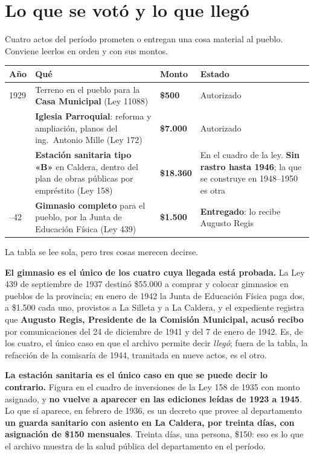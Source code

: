 \section{Lo que se votó y lo que llegó}

Cuatro actos del período prometen o entregan una cosa material al pueblo. Conviene leerlos en
orden y con sus montos.

{\small
\begin{longtable}{@{}p{1.4cm}p{5.5cm}p{2.2cm}p{3.5cm}@{}}
\toprule
\textbf{Año} & \textbf{Qué} & \textbf{Monto} & \textbf{Estado} \\
\midrule
\endhead
1929 & Terreno en el pueblo para la \textbf{Casa Municipal} (Ley 11088) & \textbf{\$500} & Autorizado \\
\addlinespace
1935 & \textbf{Iglesia Parroquial}: reforma y ampliación, planos del ing.\ Antonio Mille (Ley 172) & \textbf{\$7.000} & Autorizado \\
\addlinespace
1935 & \textbf{Estación sanitaria tipo «B»} en Caldera, dentro del plan de obras públicas por empréstito (Ley 158) & \textbf{\$18.360} & En el cuadro de la ley. \textbf{Sin rastro hasta 1946}; la que se construye en 1948--1950 es otra \\
\addlinespace
1937--42 & \textbf{Gimnasio completo} para el pueblo, por la Junta de Educación Física (Ley 439) & \textbf{\$1.500} & \textbf{Entregado}: lo recibe Augusto Regis\index{Regis, Augusto} \\
\bottomrule
\end{longtable}}

La tabla se lee sola, pero tres cosas merecen decirse.

\textbf{El gimnasio es el único de los cuatro cuya llegada está probada.} La Ley 439 de
septiembre de 1937 destinó \$55.000 a comprar y colocar gimnasios en pueblos de la provincia; en
enero de 1942 la Junta de Educación Física paga dos, a \$1.500 cada uno, provistos a La Silleta
y a La Caldera, y el expediente registra que \textbf{Augusto Regis, Presidente de la Comisión
Municipal, acusó recibo} por comunicaciones del 24 de diciembre de 1941 y del 7 de enero de
1942. Es, de los cuatro, el único caso en que el archivo permite decir \textit{llegó}; fuera de la tabla, la refacción de la comisaría de 1944, tramitada en nueve actos, es el otro.

\textbf{La estación sanitaria es el único caso en que se puede decir lo contrario.} Figura en el
cuadro de inversiones de la Ley 158 de 1935 con monto asignado, y \textbf{no vuelve a aparecer
en las ediciones leídas de 1923 a 1945}. Lo que sí aparece, en febrero de 1936, es un
decreto que provee al departamento \textbf{un guarda sanitario con asiento en La Caldera, por
treinta días, con asignación de \$150 mensuales}. Treinta días, una persona, \$150: eso es lo que
el archivo muestra de la salud pública del departamento en el período.

